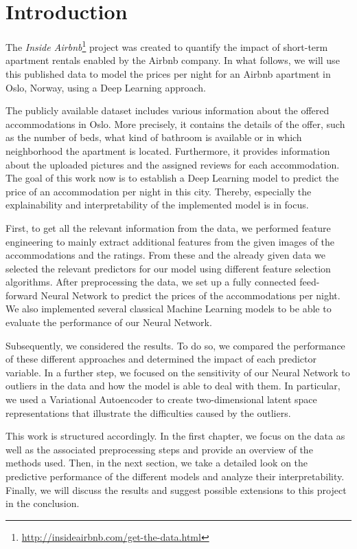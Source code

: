 \section{Introduction}


The \emph{Inside Airbnb}\footnote{\url{http://insideairbnb.com/get-the-data.html}} project \citep{cox2022} was created to quantify the impact of short-term apartment rentals enabled by the Airbnb company.
In what follows, we will use this published data to model the prices per night for an Airbnb apartment in Oslo, Norway, using a Deep Learning approach.

The publicly available dataset includes various information about the offered accommodations in Oslo.
More precisely, it contains the details of the offer, such as the number of beds, what kind of bathroom is available or in which neighborhood the apartment is located.
Furthermore, it provides information about the uploaded pictures and the assigned reviews for each accommodation.
The goal of this work now is to establish a Deep Learning model to predict the price of an accommodation per night in this city.
Thereby, especially the explainability and interpretability of the implemented model is in focus.

First, to get all the relevant information from the data, we performed feature engineering to mainly extract additional features from the given images of the accommodations and the ratings.
From these and the already given data we selected the relevant predictors for our model using different feature selection algorithms.
After preprocessing the data, we set up a fully connected feed-forward Neural Network to predict the prices of the accommodations per night.
We also implemented several classical Machine Learning models to be able to evaluate the performance of our Neural Network.

Subsequently, we considered the results.
To do so, we compared the performance of these different approaches and determined the impact of each predictor variable.
In a further step, we focused on the sensitivity of our Neural Network to outliers in the data and how the model is able to deal with them.
In particular, we used a Variational Autoencoder to create two-dimensional latent space representations that illustrate the difficulties caused by the outliers.

This work is structured accordingly.
In the first chapter, we focus on the data as well as the associated preprocessing steps and provide an overview of the methods used.
Then, in the next section, we take a detailed look on the predictive performance of the different models and analyze their interpretability.
Finally, we will discuss the results and suggest possible extensions to this project in the conclusion.

